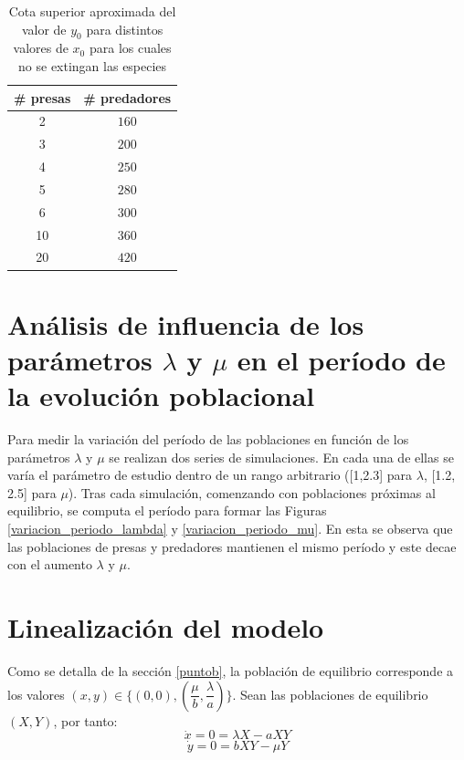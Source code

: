 \documentclass{article}
\numberwithin{equation}{section}
\begin{document}
\begin{multicols}{2}
\begin{table}[H]
\center
\begin{tabular}{|c|c|}
\hline
\# presas & \# predadores \\
\hline
2 & $ 160$ \\
\hline
3 & $ 200$ \\
\hline
4 & $ 250$ \\
\hline
5 & $ 280$ \\
\hline
6 & $ 300$ \\
\hline
10 & $ 360$ \\
\hline
20 & $ 420$ \\
\hline
\end{tabular}
\caption{Cota superior aproximada del valor de $y_0$ para distintos valores de $x_0$ para los cuales no se extingan las especies}
\label{table:cota_pred}
\end{table}

\section{Análisis de influencia de los parámetros $\lambda$ y $\mu$ en el período de la evolución poblacional}
\label{puntoc}
Para medir la variación del período de las poblaciones en función de los parámetros $\lambda$ y $\mu$ se realizan dos series de simulaciones. En cada una de ellas se varía el parámetro de estudio dentro de un rango arbitrario ([1,2.3] para $\lambda$, [1.2, 2.5] para $\mu$). Tras cada simulación, comenzando con poblaciones próximas al equilibrio, se computa el período para formar las Figuras \ref{variacion_periodo_lambda} y \ref{variacion_periodo_mu}. En esta se observa que las poblaciones de presas y predadores mantienen el mismo período y este decae con el aumento $\lambda$ y $\mu$.


\section{Linealización del modelo}
\label{puntod}
Como se detalla de la sección \ref{puntob}, la población de equilibrio corresponde a los valores $(x,y) \in \{(0,0),(\dfrac{\mu}{b},\dfrac{\lambda}{a})\}$.
Sean las poblaciones de equilibrio $(X,Y)$, por tanto:
\begin{equation}
\label{zero1}
\dot x = 0 = \lambda X - a X Y
\end{equation}
\begin{equation}
\label{zero2}
\dot y = 0 = b X Y - \mu Y
\end{equation}


\end{multicols}
\end{document}

